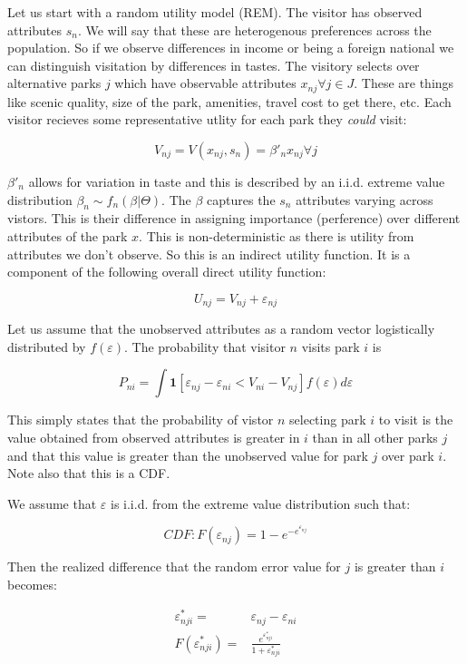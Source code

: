 \documentclass[
  letterpaper,
  DIV=11,
  numbers=noendperiod]{scrartcl}
\begin{document}
Let us start with a random utility model (REM). The visitor has observed
attributes \(s_n\). We will say that these are heterogenous preferences
across the population. So if we observe differences in income or being a
foreign national we can distinguish visitation by differences in tastes.
The visitory selects over alternative parks \(j\) which have observable
attributes \(x_{nj} \forall j \in J\). These are things like scenic
quality, size of the park, amenities, travel cost to get there, etc.
Each visitor recieves some representative utlity for each park they
\emph{could} visit:

\[
V_{nj} = V(x_{nj}, s_n) = \beta'_n x_{nj} \forall j
\]

\(\beta'_n\) allows for variation in taste and this is described by an
i.i.d. extreme value distribution \(\beta_n \sim f_n(\beta|\Theta)\).
The \(\beta\) captures the \(s_n\) attributes varying across vistors.
This is their difference in assigning importance (perference) over
different attributes of the park \(x\). This is non-deterministic as
there is utility from attributes we don't observe. So this is an
indirect utility function. It is a component of the following overall
direct utility function:

\[
U_{nj} =  V_{nj} + \varepsilon_{nj}
\]

Let us assume that the unobserved attributes as a random vector
logistically distributed by \(f(\varepsilon)\). The probability that
visitor \(n\) visits park \(i\) is

\[
P_{ni} = \int \mathbf{1}[\varepsilon_{nj} - \varepsilon_{ni} <  V_{ni} -  V_{nj}] f(\varepsilon) d \varepsilon
\]

This simply states that the probability of vistor \(n\) selecting park
\(i\) to visit is the value obtained from observed attributes is greater
in \(i\) than in all other parks \(j\) and that this value is greater
than the unobserved value for park \(j\) over park \(i\). Note also that
this is a CDF.

We assume that \(\varepsilon\) is i.i.d. from the extreme value
distribution such that:

\[
CDF: F(\varepsilon_{nj}) = 1 - e^{-e^{\varepsilon_{nj}}}
\]

Then the realized difference that the random error value for \(j\) is
greater than \(i\) becomes:

\[
\begin{align}
\varepsilon^*_{nji} = & \varepsilon_{nj} - \varepsilon_{ni} \\ 
F(\varepsilon^*_{nji}) = & \frac{e^{\varepsilon^*_{nji}}}{1 + \varepsilon^*_{nji}} 
\end{align}
\]
\end{document}
